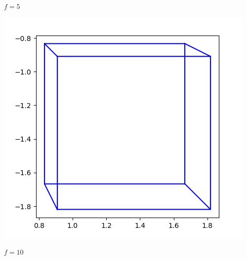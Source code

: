 \documentclass[11pt,class=report,crop=false]{standalone}
\begin{document}
\begin{activite}[Perspective]
\begin{enumerate}
\begin{center}
\begin{minipage}{0.22\textwidth}
\begin{center}
		$f=5$
	\end{center}
	\end{minipage}
	\begin{minipage}{0.22\textwidth}
	\begin{center}
		\includegraphics[scale=\myscale,scale=0.22]{ecran-perspective-6-10}
		
		$f=10$
	\end{center}
	\end{minipage}
	\end{center}	
		  
\end{enumerate}
	
\end{activite}


\end{document}
